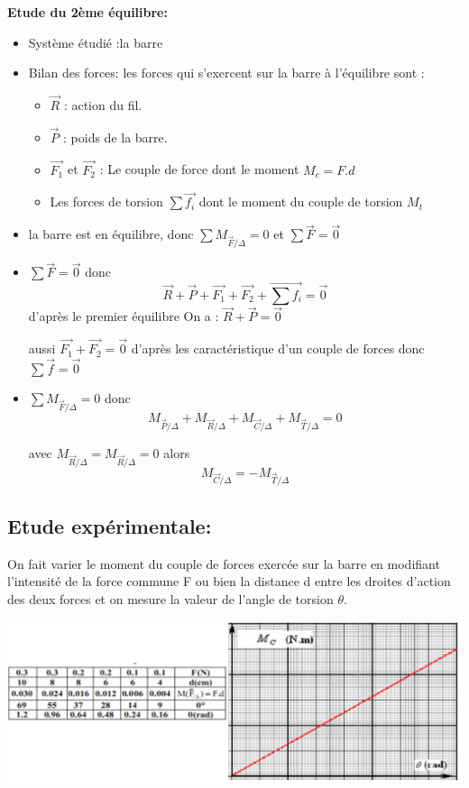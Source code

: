 \documentclass[12pt]{article}
\begin{document}
\textbf{Etude du 2ème équilibre:}
\begin{itemize}
	\item Système étudié :{la barre}

	\item Bilan des forces: les forces qui s'exercent sur la barre à l'équilibre sont :
		\begin{itemize}

			\item $\vec{R}$ : action du fil.
			\item $\vec{P}$ : poids de la barre.
			\item $\vec{F_1}$ et $ \vec{F_2}$ : Le couple de force dont le moment $M_c = F.d$
			\item Les forces de torsion $\sum{\vec{f_i}}$ dont le moment du couple de torsion $M_t$
		\end{itemize}
	\item la barre est en équilibre, donc $\sum{M_{\vec{F}/{\Delta}} = 0}$ et $\sum{\vec{F} = \vec{0}}$

	\item $\sum{\vec{F} = \vec{0}}$ donc $$\vec{R} + \vec{P}+\vec{F_1}+\vec{F_2} + \vec{\sum{f_i}} = \vec{0}  $$ 
		d'après le premier équilibre  On a :  $\vec{R} + \vec{P} = \vec{0}$

		aussi $\vec{F_1}+\vec{F_2} = \vec{0} $ d'après les caractéristique d'un couple de forces donc $\sum{\vec{f}} = \vec{0}$


	\item $\sum{M_{\vec{F}/{\Delta}} = 0}$ donc 
		$$M_{\vec{P}/{\Delta}}  + M_{\vec{R}/{\Delta}} + M_{\vec{C}/{\Delta}} +  M_{\vec{T}/{\Delta}}= 0$$ 

		avec $M_{\vec{R}/{\Delta}} = M_{\vec{R}/{\Delta}} = 0$
		alors $$M_{\vec{C}/{\Delta}} =  -M_{\vec{T}/{\Delta}}$$
\end{itemize}


\subsection{Etude expérimentale: }

On fait varier le moment du couple de forces exercée sur la barre en modifiant l'intensité de la force commune F ou bien la
distance d entre les droites d'action des deux forces et on mesure la valeur de l'angle de torsion $\theta$.


\begin{center}
\includegraphics[width=1\textwidth]{./img/tor00.png}
\end{center}
\end{document}
